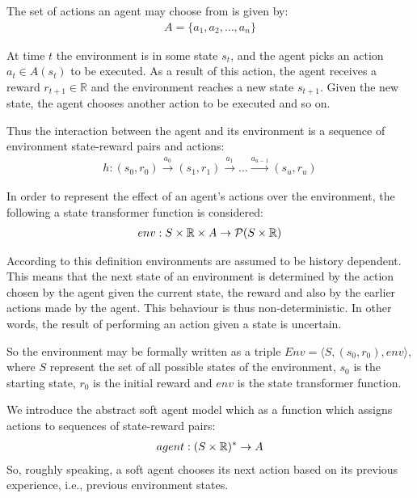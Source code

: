The set of actions an agent may choose from is given by:
\begin{align}
A=\{a_{1},a_{2}, \ldots , a_{n} \}
\end{align}

At time $t$ the environment is in some state $s_{t}$, and the agent picks an action $a_{t} \in A(s_{t})$ to be executed. As a result of this action, the agent receives a reward $r_{t+1} \in \mathbb{R}$ and the environment reaches a new state $s_{t+1}$. Given the new state, the agent chooses another action to be executed and so on.

Thus the interaction between the agent and its environment is a sequence of environment state-reward pairs and actions:
\begin{align}
h: (s_{0},r_{0}) \xrightarrow{a_{0}} (s_{1},r_{1}) \xrightarrow{a_{1}} \ldots \xrightarrow{a_{u-1}} (s_{u},r_{u})
\end{align}

In order to represent the effect of an agent's actions over the environment, the following a state transformer function is considered:
\begin{align}
env:S \times \mathbb{R} \times A \rightarrow \mathcal P (S \times \mathbb{R})
\end{align}

According to this definition environments are assumed to be history dependent. This means that the next state of an environment is determined by the action chosen by the agent given the current state, the reward and also by the earlier actions made by the agent. This behaviour is thus non-deterministic. In other words, the result of performing an action given a state is uncertain.

So the environment may be formally written as a triple $Env= \langle S, (s_{0}, r_{0}), env \rangle,$ where $S$ represent the set of all possible states of the environment, $s_{0}$ is the starting state, $r_{0}$ is the initial reward and $env$ is the state transformer function.

We introduce the abstract soft agent model which as a function which assigns actions to sequences of state-reward pairs:
\begin{align}
agent: (S \times \mathbb R)^{*} \rightarrow A
\end{align}
So, roughly speaking, a soft agent chooses its next action based on its previous experience, i.e., previous environment states. 

